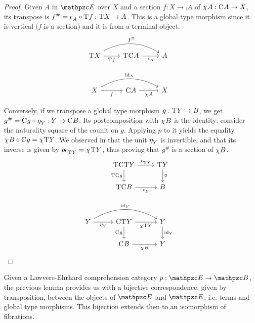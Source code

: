 \documentclass{lmcs} %
\theoremstyle{plain}\newtheorem{satz}[thm]{Satz} %
\begin{document}
			\begin{proof}
				Given $A$ in $\ct{E}$ over $X$ and a section $f:X\to \comp{}A$ of $\chi^{}A:\mathrm{C}^{}A\to X$, its transpose is $f^{\#}=\mathrm{\epsilon}^{}_A\circ\mathrm{T}^{}f:\mathrm{T}^{}X\to A$. This is a global type morphism since it is vertical ($f$ is a section) and it is from a terminal object.
				\[\begin{tikzcd}
					{\term{}X} & {\term{}\comp{}A} & A \\
					\\
					X & {\comp{}A} & X
					\arrow["{\term{}f}"', from=1-1, to=1-2]
					\arrow["{f^{\#}}", bend left, from=1-1, to=1-3]
					\arrow["{\coun{}_A}"', from=1-2, to=1-3]
					\arrow["f"', from=3-1, to=3-2]
					\arrow["{\id{X}}", bend left, from=3-1, to=3-3]
					\arrow["{\jcomp{}A}"', from=3-2, to=3-3]
				\end{tikzcd}\]
				
				Conversely, if we transpose a global type morphism $g:\mathrm{T}^{}Y\to B$, we get $g^{\#}=\mathrm{C}^{}g\circ\mathrm{\eta}^{}_Y:Y\to\mathrm{C}^{}B$. Its postcomposition with $\chi^{}B$ is the identity: consider the naturality square of the counit on $g$. Applying $p$ to it yields the equality $\chi^{}B\circ\mathrm{C}^{}g=\chi^{}{\mathrm{T}^{}Y}$. We observed in  that the unit $\mathrm{\eta}^{}_Y$ is invertible, and that its inverse is given by $p\mathrm{\epsilon}^{}_{\mathrm{T}^{}Y}=\chi^{}{\mathrm{T}^{}Y}$, thus proving that $g^{\#}$ is a section of $\chi^{}B$.
				\[\begin{tikzcd}
					& {\term{}\comp{}\term{}Y} & {\term{}Y} \\
					& {\term{}\comp{}B} & B \\
					\\
					Y & {\comp{}\term{}Y} & Y \\
					& {\comp{}B} & Y
					\arrow["{\coun{}_{\term{}Y}}", from=1-2, to=1-3]
					\arrow["{\term{}\comp{}g}"', from=1-2, to=2-2]
					\arrow["g", from=1-3, to=2-3]
					\arrow["{\coun{}_B}"', from=2-2, to=2-3]
					\arrow["{\un{}_Y}"', from=4-1, to=4-2]
					\arrow["{\id{Y}}", bend left, from=4-1, to=4-3]
					\arrow["{\jcomp{}\term{}Y}"', from=4-2, to=4-3]
					\arrow["{\comp{}g}"', from=4-2, to=5-2]
					\arrow["{\id{Y}}", from=4-3, to=5-3]
					\arrow["{\jcomp{}B}"', from=5-2, to=5-3]
				\end{tikzcd}\]
			\end{proof}

Given a Lawvere-Ehrhard comprehension category $p : \ct{E}\to\ct{B}$, 
the previous lemma provides us 
with a bijective correspondence, given by transposition, between 
the objects of $\tcat{\ct{E}}$ and $\gtcat{\ct{E}}$, i.e. terms and global type morphisms. 
This bijection extends then to an isomorphism of fibrations.
\end{document}
